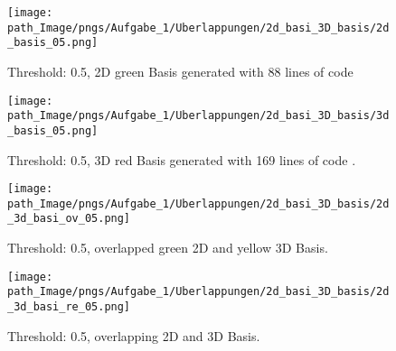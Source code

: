 \begin{figure}[!h]
\begin{minipage}{0.45\textwidth}
  \texttt{[image: path\_Image/pngs/Aufgabe\_1/Uberlappungen/2d\_basi\_3D\_basis/2d\_basis\_05.png]}
      \vspace*{-10mm}
	\caption{Threshold: 0.5, 2D green Basis generated with 88 lines of code \protect\cite{Andreassen.2011}} 
	\label{fig_2dbasis_05}
\end{minipage}
\hfill
\begin{minipage}{0.45\textwidth}
  \texttt{[image: path\_Image/pngs/Aufgabe\_1/Uberlappungen/2d\_basi\_3D\_basis/3d\_basis\_05.png]}
      \vspace*{-10mm}
	\caption{Threshold: 0.5, 3D red Basis generated with 169 lines of code \protect\cite{Liu.2014}.} 
	\label{fig_3dbasis_05}
\end{minipage}
\end{figure}
\begin{figure}[!h]
\begin{minipage}{0.45\textwidth}
  \texttt{[image: path\_Image/pngs/Aufgabe\_1/Uberlappungen/2d\_basi\_3D\_basis/2d\_3d\_basi\_ov\_05.png]}
      \vspace*{-10mm}
	\caption{Threshold: 0.5, overlapped green 2D and yellow 3D Basis.} 
	\label{fig_3dbasis_overl_05}
\end{minipage}
\hfill
\begin{minipage}{0.45\textwidth}
  \texttt{[image: path\_Image/pngs/Aufgabe\_1/Uberlappungen/2d\_basi\_3D\_basis/2d\_3d\_basi\_re\_05.png]}
      \vspace*{-10mm}
	\caption{Threshold: 0.5, overlapping 2D and 3D Basis.} 
	\label{fig_3dbasis_re_05}
	\end{minipage}
\end{figure}

